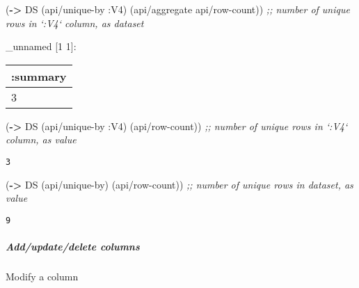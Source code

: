 \documentclass[]{article}
\newenvironment{Shaded}{\begin{snugshade}}{\end{snugshade}}
\newcommand{\AttributeTok}[1]{\textcolor[rgb]{0.77,0.63,0.00}{#1}}
\newcommand{\CommentTok}[1]{\textcolor[rgb]{0.56,0.35,0.01}{\textit{#1}}}
\newcommand{\DecValTok}[1]{\textcolor[rgb]{0.00,0.00,0.81}{#1}}
\newcommand{\KeywordTok}[1]{\textcolor[rgb]{0.13,0.29,0.53}{\textbf{#1}}}
\newcommand{\NormalTok}[1]{#1}
\newcommand{\VariableTok}[1]{\textcolor[rgb]{0.00,0.00,0.00}{#1}}
\let\oldsubparagraph\subparagraph
\renewcommand{\subparagraph}[1]{\oldsubparagraph{#1}\mbox{}}
\begin{document}
\begin{Shaded}
\begin{Highlighting}[]
\NormalTok{(}\KeywordTok{->}\NormalTok{ DS}
\NormalTok{    (api/unique-by }\AttributeTok{:V4}\NormalTok{)}
\NormalTok{    (api/aggregate api/row-count)) }\CommentTok{;; number of unique rows in `:V4` column, as dataset}
\end{Highlighting}
\end{Shaded}

\_unnamed {[}1 1{]}:

\begin{longtable}[]{@{}l@{}}
\toprule
:summary\tabularnewline
\midrule
\endhead
3\tabularnewline
\bottomrule
\end{longtable}

\begin{Shaded}
\begin{Highlighting}[]
\NormalTok{(}\KeywordTok{->}\NormalTok{ DS}
\NormalTok{    (api/unique-by }\AttributeTok{:V4}\NormalTok{)}
\NormalTok{    (api/row-count)) }\CommentTok{;; number of unique rows in `:V4` column, as value}
\end{Highlighting}
\end{Shaded}

\begin{verbatim}
3
\end{verbatim}

\begin{Shaded}
\begin{Highlighting}[]
\NormalTok{(}\KeywordTok{->}\NormalTok{ DS}
\NormalTok{    (api/unique-by)}
\NormalTok{    (api/row-count)) }\CommentTok{;; number of unique rows in dataset, as value}
\end{Highlighting}
\end{Shaded}

\begin{verbatim}
9
\end{verbatim}

\hypertarget{addupdatedelete-columns}{%
\subparagraph{Add/update/delete columns}\label{addupdatedelete-columns}}

Modify a column

\begin{Shaded}
\end{Shaded}
\end{document}
